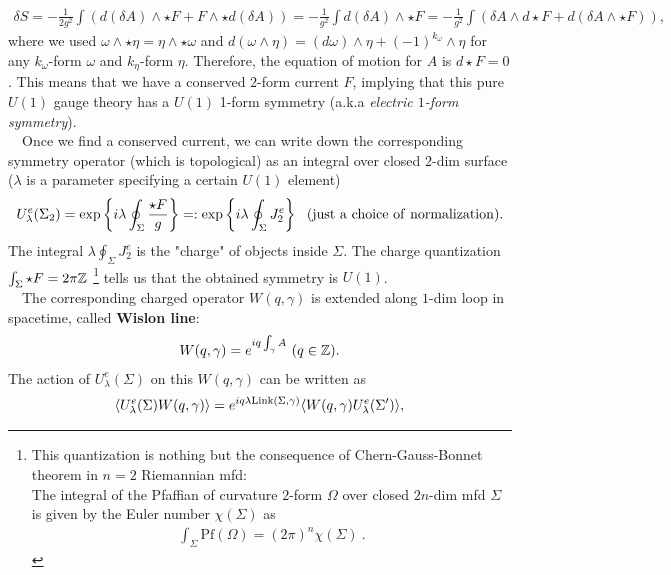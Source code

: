 \documentclass{ltjsarticle}
\theoremstyle{mystyle} %
\numberwithin{equation}{section}
\begin{document}
\begin{align}
    \delta S= -\frac{1}{2g^2}\int (d(\delta A)\wedge \star F + F\wedge \star d(\delta A) )
    =-\frac{1}{g^2} \int d(\delta A)\wedge \star F 
    =-\frac{1}{g^2}\int (\delta A \wedge d \star F + d(\delta A \wedge \star F)), 
\end{align}
where we used $\omega\wedge \star \eta = \eta\wedge \star \omega$ and 
$d(\omega\wedge \eta) = (d\omega)\wedge \eta + (-1)^{k_\omega} \wedge \eta$ for 
any $k_\omega$-form $\omega$ and $k_\eta$-form $\eta$. 
Therefore, the equation of motion for $A$ is $d\star F=0$. 
This means that we have a conserved $2$-form current $F$, implying that this pure $U(1)$ gauge theory has a $U(1)$ 1-form symmetry (a.k.a \textit{electric $1$-form symmetry}). \\
　Once we find a conserved current, we can write down the corresponding symmetry operator (which is topological) as an integral over closed $2$-dim surface 
($\lambda$ is a parameter specifying a certain $U(1)$ element)
\begin{align}
    U^{e}_{\lambda}(\Sigma_2) = \exp\left\{{i\lambda\oint_{\Sigma}\frac{\star F}{g}}\right\}=: \exp\left\{{i\lambda\oint_{\Sigma}J^e_2}\right\} ~~
    (\mathrm{just~a~choice~of~normalization}). 
    \label{electric1form}
\end{align}
The integral $\lambda\oint_{\Sigma}J^e_2$ is the "charge" of objects inside $\Sigma$. 
The charge quantization $\int_{\Sigma} \star F = 2\pi \mathbb{Z}$
\footnote{This quantization is nothing but the consequence of Chern-Gauss-Bonnet theorem in $n=2$ Riemannian mfd: \\
The integral of the Pfaffian of curvature $2$-form $\Omega$ over closed $2n$-dim mfd $\Sigma$ is given by the Euler number $\chi(\Sigma)$ as 
\begin{align}
    \int_{\Sigma} \mathrm{Pf}(\Omega) = (2\pi)^n \chi(\Sigma)~. 
\end{align}}
 tells us that the obtained symmetry is $U(1)$. \\
　The corresponding charged operator $W(q, \gamma)$ is extended along $1$-dim loop in spacetime, called \textbf{Wislon line}: 
  \begin{align}
    W(q, \gamma)=e^{iq\int_{\gamma}A}~(q\in \mathbb{Z}). 
  \end{align}
  The action of $U^{e}_\lambda(\Sigma)$ on this $W(q, \gamma)$ can be written as
  \begin{align}
    \langle{U^e_{\lambda}(\Sigma)W(q, \gamma)}\rangle=e^{iq\lambda\mathrm{Link}(\Sigma, \gamma)}\langle{W(q, \gamma)U^e_{\lambda}(\Sigma')}\rangle, 
    \label{ActionWlison} 
  \end{align}
\end{document}
